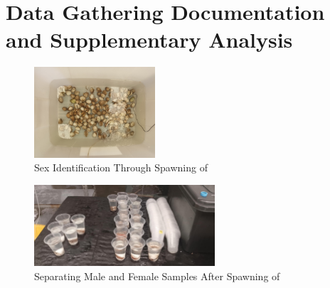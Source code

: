 %
%
%                 

\chapter{Data Gathering Documentation and Supplementary Analysis}
\label{sec:appendixa}



%

\begin{figure}[!htbp]
	\centering
	\includegraphics[width=0.4\textwidth, angle=90]{figures/spawning.jpg}
	\caption{Sex Identification Through Spawning of \Tegillarcagranosa}
\end{figure}

\begin{figure}[!htbp]
	\centering
	\includegraphics[width=0.6\textwidth]{figures/spawning_separated.jpg}
	\caption{Separating Male and Female Samples After Spawning of \Tegillarcagranosa}
\end{figure}

